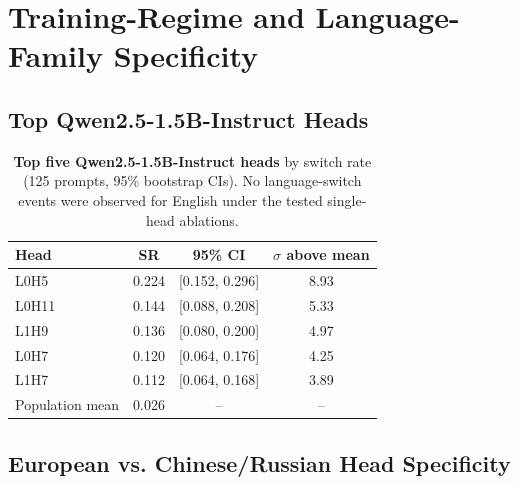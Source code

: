 \documentclass[11pt]{article}
\begin{document}
\section{Training-Regime and Language-Family Specificity}
\label{app:language_family}

\subsection{Top Qwen2.5-1.5B-Instruct Heads}
\label{app:qwen_top}

\begin{table}[H]
\caption{\textbf{Top five Qwen2.5-1.5B-Instruct heads} by switch rate
(125 prompts, 95\% bootstrap CIs). No language-switch events were observed for English under the tested single-head ablations.}
\label{tab:qwen_top}
\centering\small
\begin{tabular}{lccc}
\toprule
\textbf{Head} & \textbf{SR} & \textbf{95\% CI} & \textbf{$\sigma$ above mean} \\
\midrule
L0H5  & 0.224 & {[0.152, 0.296]} & 8.93 \\
L0H11 & 0.144 & {[0.088, 0.208]} & 5.33 \\
L1H9  & 0.136 & {[0.080, 0.200]} & 4.97 \\
L0H7  & 0.120 & {[0.064, 0.176]} & 4.25 \\
L1H7  & 0.112 & {[0.064, 0.168]} & 3.89 \\
\midrule
Population mean & 0.026 & -- & -- \\
\bottomrule
\end{tabular}
\end{table}

\subsection{European vs. Chinese/Russian Head Specificity}
\label{app:extended_table}
\end{document}

